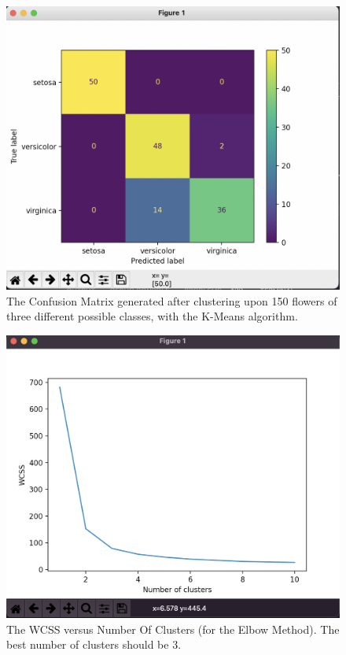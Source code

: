 \documentclass[10pt,twocolumn]{article}
\begin{document}
\begin{figure}[h]
  \centering
  \includegraphics[scale=0.3]{confusion_matrix.png}
  \vspace{20px}
  \caption{The Confusion Matrix generated after clustering upon 150 flowers of three different possible classes, with the K-Means algorithm.}
  \label{confusion_matrix}
\end{figure}

\begin{figure}[H]
  \centering
  \includegraphics[scale=0.3]{iris_elbow.png}
  \vspace{20px}
  \caption{The WCSS versus Number Of Clusters (for the Elbow Method). The best number of clusters should be 3.}
  \label{iris_elbow}
\end{figure}
\end{document}

